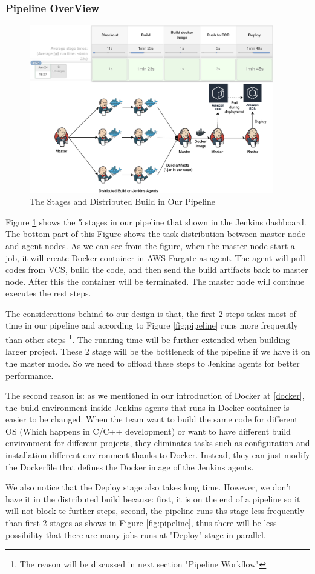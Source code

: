\subsubsection{Pipeline OverView}
\begin{figure}[h]
    \centering
    \includegraphics[width=0.95\textwidth]{pics/overview.png}
    \caption{The Stages and Distributed Build in Our Pipeline}
    \label{fig:overview}
\end{figure}
Figure \ref{fig:overview} shows the 5 stages in our pipeline that shown in the Jenkins dashboard. The bottom part of this Figure shows the task distribution between master node and agent nodes. 
As we can see from the figure, when the master node start a job, it will create Docker container in AWS Fargate as agent. The agent will pull codes from VCS, build the code, and then send the build artifacts back to master node. After this the container will be terminated. The master node will continue executes the rest steps.
\par
The considerations behind to our design is that, the first 2 steps takes most of time in our pipeline and according to Figure \ref{fig:pipeline} runs more frequently than other steps \footnote{The reason will be discussed in next section "Pipeline Workflow"}. The running time will be further extended when building larger project. These 2 stage will be the bottleneck of the pipeline if we have it on the master mode. So we need to offload these steps to Jenkins agents for better performance.
\par
The second reason is: as we mentioned in our introduction of Docker at \ref{docker}, the build environment inside Jenkins agents that runs in Docker container is easier to be changed. When the team want to build the same code for different OS (Which happens in C/C++ development) or want to have different build environment for different projects, they eliminates tasks such as configuration and installation different environment thanks to Docker. Instead, they can just modify the Dockerfile that defines the Docker image of the Jenkins agents.
\par
We also notice that the Deploy stage also takes long time. However, we don't have it in the distributed build because: first, it is on the end of a pipeline so it will not block te further steps, second, the pipeline runs ths stage less frequently than first 2 stages as shows in Figure \ref{fig:pipeline}, thus there will be less possibility that there are many jobs runs at "Deploy" stage in parallel.
